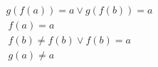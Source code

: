 \begin{gather*}
%
g(f(a)) = a \lor g(f(b)) = a
~\\~
f(a) = a
~\\~
f(b)  \neq  f(b) \lor f(b) = a
~\\~
g(a)  \neq  a
%
\end{gather*}

